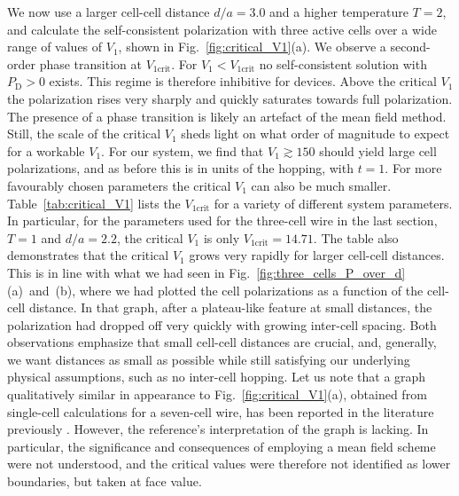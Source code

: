 We now use a larger cell-cell distance $d/a = 3.0$ and a higher temperature $T =
2$, and calculate the self-consistent polarization with three active cells over
a wide range of values of $V_1$, shown in Fig.~\ref{fig:critical_V1}(a). We
observe a second-order phase transition at $V_{1\textrm{crit}}$. For $V_1 <
V_{1\textrm{crit}}$ no self-consistent solution with $P_\text{D} > 0 $ exists. This
regime is therefore inhibitive for  devices. Above the critical $V_1$
the polarization rises very sharply and quickly saturates towards full
polarization. The presence of a phase transition is likely an artefact of the
mean field method. Still, the scale of the critical $V_1$ sheds light on what
order of magnitude to expect for a workable $V_1$. For our system, we find that
$V_1 \gtrsim 150$ should yield large cell polarizations, and as before this is
in units of the hopping, with $t = 1$. For more favourably chosen parameters the
critical $V_1$ can also be much smaller. Table~\ref{tab:critical_V1} lists the
$V_{1\textrm{crit}}$ for a variety of different system parameters. In
particular, for the parameters used for the three-cell wire in the last section,
$T = 1$ and $d/a = 2.2$, the critical $V_1$ is only $V_{1\textrm{crit}} =
14.71$. The table also demonstrates that the critical $V_1$ grows very rapidly
for larger cell-cell distances. This is in line with what we had seen in
Fig.~\ref{fig:three_cells_P_over_d}(a)~and~(b), where we had plotted the cell
polarizations as a function of the cell-cell distance. In that graph, after a
plateau-like feature at small distances, the polarization had dropped off very
quickly with growing inter-cell spacing. Both observations emphasize that small
cell-cell distances are crucial, and, generally, we want distances as small as
possible while still satisfying our underlying physical assumptions, such as no
inter-cell hopping. Let us note that a graph qualitatively similar in appearance
to Fig.~\ref{fig:critical_V1}(a), obtained from single-cell 
calculations for a seven-cell wire, has been reported in the literature
previously \cite{lent1993lines}. However, the reference's interpretation of the
graph is lacking. In particular, the significance and consequences of employing
a mean field scheme were not understood, and the critical values were therefore
not identified as lower boundaries, but taken at face value.

